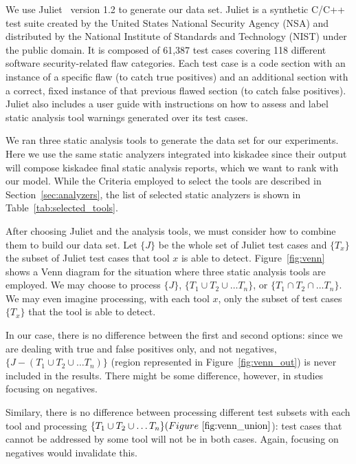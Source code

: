We use Juliet~\cite{juliet} version 1.2 to generate our data set. Juliet is a
synthetic C/C++ test suite created by the United States National Security
Agency (NSA) and distributed by the National Institute of Standards and
Technology (NIST) under the public domain. It is composed of 61,387 test cases
covering 118 different software security-related flaw categories. Each test
case is a code section with an instance of a specific flaw (to catch true
positives) and an additional section with a correct, fixed instance of that
previous flawed section (to catch false positives).  Juliet also includes a
user guide with instructions on how to assess and label static analysis tool
warnings generated over its test cases.

We ran three static analysis tools to generate the data set for our
experiments. Here we use the same static analyzers integrated into
kiskadee since their output will compose kiskadee final
static analysis reports, which we want to rank with our model.
While the Criteria employed to select the tools are described
in Section~\ref{sec:analyzers}, the list of selected static
analyzers is shown in Table~\ref{tab:selected_tools}.

After choosing Juliet and the analysis tools, we must consider how to combine
them to build our data set. Let $\{J\}$ be the whole set of Juliet test cases
and $\{T_x\}$ the subset of Juliet test cases that tool $x$ is able to detect.
Figure~\ref{fig:venn} shows a Venn diagram for the situation where three static
analysis tools are employed. We may choose to process $\{J\}$, $\{T_1 \cup
T_2\cup\dots T_n\}$, or $\{T_1 \cap T_2 \cap\dots T_n\}$. We may even imagine
processing, with each tool $x$, only the subset of test cases $\{T_x\}$ that
the tool is able to detect.



In our case, there is no difference
between the first and second options: since we are dealing with
true and false positives only, and not negatives, $\{J - (T_1 \cup T_2\cup\dots T_n)\}$
(region represented in Figure~\ref{fig:venn_out})
is never included in the results. There might be some difference,
however, in studies focusing on negatives.



Similary, there is no difference between processing different test
subsets with each tool and processing $\{T_1 \cup T_2\cup\dots T_n\} (Figure~\ref{fig:venn_union}$):
test cases that cannot be addressed by some tool will not be in
both cases. Again, focusing on negatives would invalidate this.

